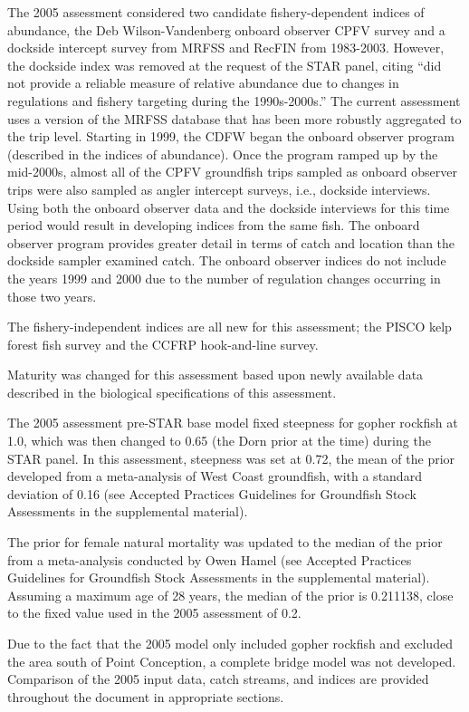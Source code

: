 \documentclass[12pt,]{article}
\begin{document}
The 2005 assessment considered two candidate fishery-dependent indices
of abundance, the Deb Wilson-Vandenberg onboard observer CPFV survey and
a dockside intercept survey from MRFSS and RecFIN from 1983-2003.
However, the dockside index was removed at the request of the STAR
panel, citing ``did not provide a reliable measure of relative abundance
due to changes in regulations and fishery targeting during the
1990s-2000s.'' The current assessment uses a version of the MRFSS
database that has been more robustly aggregated to the trip level.
Starting in 1999, the CDFW began the onboard observer program (described
in the indices of abundance). Once the program ramped up by the
mid-2000s, almost all of the CPFV groundfish trips sampled as onboard
observer trips were also sampled as angler intercept surveys, i.e.,
dockside interviews. Using both the onboard observer data and the
dockside interviews for this time period would result in developing
indices from the same fish. The onboard observer program provides
greater detail in terms of catch and location than the dockside sampler
examined catch. The onboard observer indices do not include the years
1999 and 2000 due to the number of regulation changes occurring in those
two years.

The fishery-independent indices are all new for this assessment; the
PISCO kelp forest fish survey and the CCFRP hook-and-line survey.

Maturity was changed for this assessment based upon newly available data
described in the biological specifications of this assessment.

The 2005 assessment pre-STAR base model fixed steepness for gopher
rockfish at 1.0, which was then changed to 0.65 (the Dorn prior at the
time) during the STAR panel. In this assessment, steepness was set at
0.72, the mean of the prior developed from a meta-analysis of West Coast
groundfish, with a standard deviation of 0.16 (see Accepted Practices
Guidelines for Groundfish Stock Assessments in the supplemental
material).

The prior for female natural mortality was updated to the median of the
prior from a meta-analysis conducted by Owen Hamel (see Accepted
Practices Guidelines for Groundfish Stock Assessments in the
supplemental material). Assuming a maximum age of 28 years, the median
of the prior is 0.211138, close to the fixed value used in the 2005
assessment of 0.2.

Due to the fact that the 2005 model only included gopher rockfish and
excluded the area south of Point Conception, a complete bridge model was
not developed. Comparison of the 2005 input data, catch streams, and
indices are provided throughout the document in appropriate sections.
\end{document}
